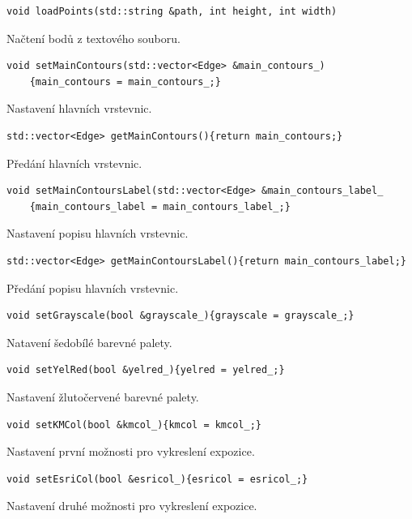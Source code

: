 \documentclass[a4paper, 12pt, oneside, titlepage]{article} %
\begin{document}
\begin{verbatim}
void loadPoints(std::string &path, int height, int width)
\end{verbatim}
Načtení bodů z textového souboru.\\

\begin{verbatim}
void setMainContours(std::vector<Edge> &main_contours_)
    {main_contours = main_contours_;}
\end{verbatim}
Nastavení hlavních vrstevnic.\\

\begin{verbatim}
std::vector<Edge> getMainContours(){return main_contours;}
\end{verbatim}
Předání hlavních vrstevnic.\\

\begin{verbatim}
void setMainContoursLabel(std::vector<Edge> &main_contours_label_
    {main_contours_label = main_contours_label_;}
\end{verbatim}
Nastavení popisu hlavních vrstevnic.\\

\begin{verbatim}
std::vector<Edge> getMainContoursLabel(){return main_contours_label;}
\end{verbatim}
Předání popisu hlavních vrstevnic.\\

\begin{verbatim}
void setGrayscale(bool &grayscale_){grayscale = grayscale_;}
\end{verbatim}
Natavení šedobílé barevné palety.\\

\begin{verbatim}
void setYelRed(bool &yelred_){yelred = yelred_;}
\end{verbatim}
Nastavení žlutočervené barevné palety.\\

\begin{verbatim}
void setKMCol(bool &kmcol_){kmcol = kmcol_;}
\end{verbatim}
Nastavení první možnosti pro vykreslení expozice.\\

\begin{verbatim}
void setEsriCol(bool &esricol_){esricol = esricol_;}
\end{verbatim}
Nastavení druhé možnosti pro vykreslení expozice.\\
\end{document}
